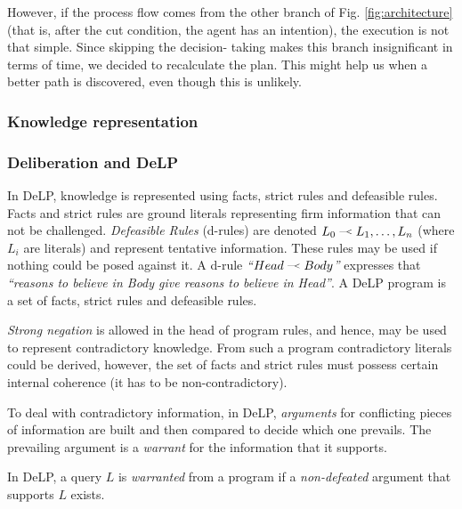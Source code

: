     However, if the process flow comes from the other branch of Fig. 
    \ref{fig:architecture} (that is, after the cut condition, the agent has an 
    intention), the execution is not that simple. Since skipping the decision-
    taking makes this branch insignificant in terms of time, we decided to 
    recalculate the plan. This might help us when a better path is discovered, 
    even though this is unlikely.

\subsubsection{Knowledge representation}

\subsubsection{Deliberation and DeLP}
    \newcommand{\drule}[2]{\mbox{$ #1\; \defleftarrow \; #2$}}
    \newcommand{\defleftarrow}{{\raise1.5pt\hbox{\tiny\defleft}}}
    \newcommand{\defleft}{\mbox{---\hspace{-1.5pt}\raise.05pt\hbox{$<$}}}
    In DeLP\cite{Garcia:2004a}, knowledge is represented using facts, strict rules
    and defeasible rules. Facts and strict rules are ground literals representing
    firm information that can not be challenged. \textit{Defeasible Rules}
    (d-rules) are denoted $\drule{L_0}{L_1, \ldots, L_n}$ (where $L_i$ are literals)
    and represent tentative information. These rules may be used if nothing could
    be posed against it. A d-rule \textit{``\drule{Head}{Body}''} expresses that
    \textit{``reasons to believe in Body give reasons to believe in Head''}. A DeLP
    program is a set of facts, strict rules and defeasible rules. 

    {\it Strong negation} is allowed in the head of program rules, and hence, may
    be used to represent contradictory knowledge. From such a program contradictory
    literals could be derived, however,  the set of facts and strict rules must
    possess certain internal coherence (it has to be non-contradictory). 

    To deal with contradictory information, in DeLP, \emph{arguments} for
    conflicting pieces of information are built and then compared to decide which
    one prevails. The prevailing argument is a \emph{warrant} for the information
    that it supports.

    In DeLP, a query $L$ is \emph{warranted} from a program if a \emph{non-defeated}
    argument that supports $L$ exists. %
    
